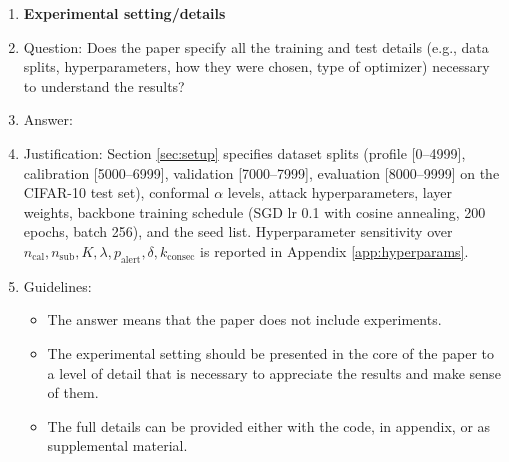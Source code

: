 \begin{enumerate}
\item {\bf Experimental setting/details}
    \item[] Question: Does the paper specify all the training and test details (e.g., data splits, hyperparameters, how they were chosen, type of optimizer) necessary to understand the results?
    \item[] Answer: \answerYes{}
    \item[] Justification: Section \ref{sec:setup} specifies dataset splits (profile [0--4999], calibration [5000--6999], validation [7000--7999], evaluation [8000--9999] on the CIFAR-10 test set), conformal $\alpha$ levels, attack hyperparameters, layer weights, backbone training schedule (SGD lr 0.1 with cosine annealing, 200 epochs, batch 256), and the seed list. Hyperparameter sensitivity over $n_\text{cal}, n_\text{sub}, K, \lambda, p_\text{alert}, \delta, k_\text{consec}$ is reported in Appendix \ref{app:hyperparams}.
    \item[] Guidelines:
    \begin{itemize}
        \item The answer \answerNA{} means that the paper does not include experiments.
        \item The experimental setting should be presented in the core of the paper to a level of detail that is necessary to appreciate the results and make sense of them.
        \item The full details can be provided either with the code, in appendix, or as supplemental material.
    \end{itemize}


\end{enumerate}
